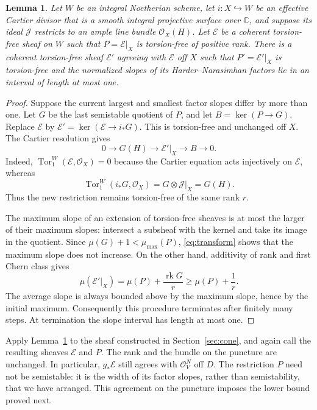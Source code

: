 \documentclass[11pt]{article}
\newtheorem{lemma}[theorem]{Lemma}
\theoremstyle{remark}
\newcommand{\C}{\mathbb C}
\newcommand{\cO}{\mathcal O}
\newcommand{\cE}{\mathcal E}
\newcommand{\cJ}{\mathcal J}
\DeclareMathOperator{\rk}{rk}
\DeclareMathOperator{\Tor}{Tor}
\begin{document}
\begin{lemma}\label{lem:balance}
Let $W$ be an integral Noetherian scheme, let $i:X\hookrightarrow W$ be
an effective Cartier divisor that is a smooth integral projective surface
over $\C$, and
suppose its ideal $\cJ$ restricts to an ample line bundle $\cO_X(H)$.
Let $\cE$ be a coherent torsion-free sheaf on $W$ such that
$P=\cE|_X$ is torsion-free of positive rank.
There is a coherent torsion-free sheaf $\cE'$ agreeing with $\cE$ off
$X$ such that $P'=\cE'|_X$ is torsion-free and the normalized slopes of
its Harder--Narasimhan factors lie in an interval of length at most one.
\end{lemma}
\begin{proof}
Suppose the current largest and smallest factor slopes differ by more
than one. Let $G$ be the last semistable quotient of $P$, and let
$B=\ker(P\to G)$. Replace $\cE$ by
$\cE'=\ker(\cE\to i_*G)$. This is torsion-free and unchanged off $X$.
The Cartier resolution gives
\begin{equation}\label{eq:transform}
 0\longrightarrow G(H)\longrightarrow \cE'|_X
   \longrightarrow B\longrightarrow0.
\end{equation}
Indeed, $\Tor_1^W(\cE,\cO_X)=0$ because the Cartier equation acts
injectively on $\cE$, whereas
\[
 \Tor_1^W(i_*G,\cO_X)=G\otimes\cJ|_X=G(H).
\]
Thus the new restriction remains torsion-free of the same rank $r$.

The maximum slope of an extension of torsion-free sheaves is at most
the larger of their maximum slopes: intersect a subsheaf with the
kernel and take its image in the quotient. Since
$\mu(G)+1<\mu_{\max}(P)$, \eqref{eq:transform} shows that the maximum
slope does not increase. On the other hand, additivity of rank and
first Chern class gives
\[
 \mu(\cE'|_X)=\mu(P)+\frac{\rk G}{r}\geq\mu(P)+\frac1r.
\]
The average slope is always bounded above by the maximum slope, hence
by the initial maximum. Consequently this procedure terminates after
finitely many steps. At termination the slope interval has length at
most one.
\end{proof}

Apply Lemma~\ref{lem:balance} to the sheaf constructed in
Section~\ref{sec:cone}, and again call the resulting sheaves $\cE$ and
$P$. The rank and the bundle on the puncture are unchanged.
In particular, $g_*\cE$ still agrees with $\cO_V^N$ off $D$.
The restriction $P$ need not be semistable: it is the width of its
factor slopes, rather than semistability, that we have arranged.
This agreement on the puncture imposes the lower bound proved next.
\end{document}
